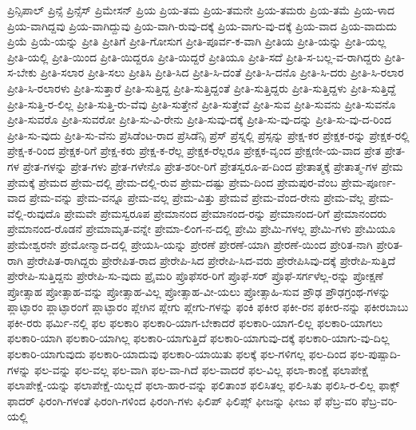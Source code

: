 {ಪ್ರಿನ್ಸಿಪಾಲ್
ಪ್ರಿನ್ಸೆ
ಪ್ರಿನ್ಸೆಸ್
ಪ್ರಿಮೇಸನ್
ಪ್ರಿಯ
ಪ್ರಿಯ-ತಮ
ಪ್ರಿಯ-ತಮನೇ
ಪ್ರಿಯ-ತಮರು
ಪ್ರಿಯ-ತಮೆ
ಪ್ರಿಯ-ಳಾದ
ಪ್ರಿಯ-ವಾಗಿದ್ದವು
ಪ್ರಿಯ-ವಾಗಿದ್ದುವು
ಪ್ರಿಯ-ವಾಗಿ-ರುವು-ದಕ್ಕೆ
ಪ್ರಿಯ-ವಾಗು-ವು-ದಕ್ಕೆ
ಪ್ರಿಯ-ವಾದ
ಪ್ರಿಯ-ವಾದುದು
ಪ್ರಿಯೆ
ಪ್ರಿಯೆ-ಯನ್ನು
ಪ್ರೀತಿ
ಪ್ರೀತಿಗೆ
ಪ್ರೀತಿ-ಗೋಸುಗ
ಪ್ರೀತಿ-ಪೂರ್ವ-ಕ-ವಾಗಿ
ಪ್ರೀತಿಯ
ಪ್ರೀತಿ-ಯನ್ನು
ಪ್ರೀತಿ-ಯಲ್ಲ
ಪ್ರೀತಿ-ಯಲ್ಲಿ
ಪ್ರೀತಿ-ಯಿಂದ
ಪ್ರೀತಿ-ಯಿದ್ದರೂ
ಪ್ರೀತಿ-ಯಿದ್ದರೆ
ಪ್ರೀತಿಯೂ
ಪ್ರೀತಿ-ಸದೆ
ಪ್ರೀತಿ-ಸ-ಬಲ್ಲ-ವ-ರಾಗಿದ್ದರು
ಪ್ರೀತಿ-ಸ-ಬೇಕು
ಪ್ರೀತಿ-ಸಲಾರ
ಪ್ರೀತಿ-ಸಲು
ಪ್ರೀತಿಸಿ
ಪ್ರೀತಿ-ಸಿದ
ಪ್ರೀತಿ-ಸಿ-ದಂತೆ
ಪ್ರೀತಿ-ಸಿ-ದನೊ
ಪ್ರೀತಿ-ಸಿ-ದರು
ಪ್ರೀತಿ-ಸಿ-ರಲಾರ
ಪ್ರೀತಿ-ಸಿ-ರಲಾರಳು
ಪ್ರೀತಿ-ಸುತ್ತಾರೆ
ಪ್ರೀತಿ-ಸುತ್ತಿದ್ದ
ಪ್ರೀತಿ-ಸುತ್ತಿದ್ದಂತೆ
ಪ್ರೀತಿ-ಸುತ್ತಿದ್ದರು
ಪ್ರೀತಿ-ಸುತ್ತಿದ್ದಳು
ಪ್ರೀತಿ-ಸುತ್ತಿದ್ದೆ
ಪ್ರೀತಿ-ಸುತ್ತಿ-ರ-ಲಿಲ್ಲ
ಪ್ರೀತಿ-ಸುತ್ತಿ-ರು-ವೆವು
ಪ್ರೀತಿ-ಸುತ್ತೇನೆ
ಪ್ರೀತಿ-ಸುತ್ತೇವೆ
ಪ್ರೀತಿ-ಸುವ
ಪ್ರೀತಿ-ಸುವನು
ಪ್ರೀತಿ-ಸುವನೊ
ಪ್ರೀತಿ-ಸುವರೊ
ಪ್ರೀತಿ-ಸುವರೋ
ಪ್ರೀತಿ-ಸು-ವಿ-ರೇನು
ಪ್ರೀತಿ-ಸುವು-ದಕ್ಕೆ
ಪ್ರೀತಿ-ಸು-ವು-ದನ್ನು
ಪ್ರೀತಿ-ಸು-ವು-ದ-ರಿಂದ
ಪ್ರೀತಿ-ಸು-ವುದು
ಪ್ರೀತಿ-ಸು-ವೆನು
ಪ್ರೆಸಿಡೆಂಟ-ರಾದ
ಪ್ರೆಸಿಡೆನ್ಸಿ
ಪ್ರೆಸ್
ಪ್ರೆಸ್ನಲ್ಲಿ
ಪ್ರೆಸ್ಸನ್ನು
ಪ್ರೇಕ್ಷ-ಕರ
ಪ್ರೇಕ್ಷಕ-ರನ್ನು
ಪ್ರೇಕ್ಷಕ-ರಲ್ಲಿ
ಪ್ರೇಕ್ಷ-ಕ-ರಿಂದ
ಪ್ರೇಕ್ಷಕ-ರಿಗೆ
ಪ್ರೇಕ್ಷ-ಕರು
ಪ್ರೇಕ್ಷ-ಕ-ರೆಲ್ಲ
ಪ್ರೇಕ್ಷಕ-ರೆಲ್ಲರೂ
ಪ್ರೇಕ್ಷಕ-ವೃಂದ
ಪ್ರೇಕ್ಷಣೀ-ಯ-ವಾದ
ಪ್ರೇತ
ಪ್ರೇತ-ಗಳ
ಪ್ರೇತ-ಗಳನ್ನು
ಪ್ರೇತ-ಗಳು
ಪ್ರೇತ-ಗಳೇನೊ
ಪ್ರೇತ-ಶರೀ-ರಿಗೆ
ಪ್ರೇತಸ್ವರೂ-ಪ-ದಿಂದ
ಪ್ರೇತಾತ್ಮಕ್ಕೆ
ಪ್ರೇತಾತ್ಮ-ಗಳ
ಪ್ರೇಮ
ಪ್ರೇಮಕ್ಕೆ
ಪ್ರೇಮದ
ಪ್ರೇಮ-ದಲ್ಲಿ
ಪ್ರೇಮ-ದಲ್ಲಿ-ರುವ
ಪ್ರೇಮ-ದಷ್ಟು
ಪ್ರೇಮ-ದಿಂದ
ಪ್ರೇಮಪುರ-ವೆಂಬ
ಪ್ರೇಮ-ಪೂರ್ಣ-ವಾದ
ಪ್ರೇಮ-ವನ್ನು
ಪ್ರೇಮ-ವನ್ನೂ
ಪ್ರೇಮ-ವಲ್ಲ
ಪ್ರೇಮ-ವಿತ್ತು
ಪ್ರೇಮವೆ
ಪ್ರೇಮ-ವೆಂದ-ರೇನು
ಪ್ರೇಮ-ವೆಲ್ಲ
ಪ್ರೇಮ-ವೆಲ್ಲಿ-ರುವುದೊ
ಪ್ರೇಮವೇ
ಪ್ರೇಮಸ್ವರೂಪ
ಪ್ರೇಮಾನಂದ
ಪ್ರೇಮಾನಂದ-ರನ್ನು
ಪ್ರೇಮಾನಂದ-ರಿಗೆ
ಪ್ರೇಮಾನಂದರು
ಪ್ರೇಮಾನಂದ-ರೊಡನೆ
ಪ್ರೇಮಾಮೃತ-ವನ್ನೇ
ಪ್ರೇಮಾ-ಲಿಂಗ-ನ-ದಲ್ಲಿ
ಪ್ರೇಮಿ
ಪ್ರೇಮಿ-ಗಳಲ್ಲ
ಪ್ರೇಮಿ-ಗಳು
ಪ್ರೇಮಿಯೂ
ಪ್ರೇಮೇಶ್ವರನೇ
ಪ್ರೇಮೋನ್ಮಾದ-ದಲ್ಲಿ
ಪ್ರೇಯಸಿ-ಯನ್ನು
ಪ್ರೇರಣೆ
ಪ್ರೇರಣೆ-ಯಾಗಿ
ಪ್ರೇರಣೆ-ಯಿಂದ
ಪ್ರೇರಿತ-ನಾಗಿ
ಪ್ರೇರಿತ-ರಾಗಿ
ಪ್ರೇರೇಪಿತ-ರಾಗಿದ್ದರು
ಪ್ರೇರೇಪಿತ-ರಾದ
ಪ್ರೇರೇಪಿ-ಸಿದ
ಪ್ರೇರೇಪಿ-ಸಿದ-ವರು
ಪ್ರೇರೇಪಿಸಿವು-ದಕ್ಕೆ
ಪ್ರೇರೇಪಿ-ಸುತ್ತಿದೆ
ಪ್ರೇರೇಪಿ-ಸುತ್ತಿದ್ದನು
ಪ್ರೇರೇಪಿ-ಸು-ವುದು
ಪ್ರೈಮರಿ
ಪ್ರೊಫೆಸರ-ರಿಗೆ
ಪ್ರೊಫೆ-ಸರ್
ಪ್ರೊಫೆ-ಸರ್ಗಳೆಲ್ಲ-ರನ್ನು
ಪ್ರೋಕ್ಷಣೆ
ಪ್ರೋತ್ಸಾಹ
ಪ್ರೋತ್ಸಾಹ-ವನ್ನು
ಪ್ರೋತ್ಸಾಹ-ವಿಲ್ಲ
ಪ್ರೋತ್ಸಾಹ-ವೀ-ಯಲು
ಪ್ರೋತ್ಸಾಹಿ-ಸುವ
ಪ್ರೌಢ
ಪ್ರೌಢಗ್ರಂಥ-ಗಳನ್ನು
ಪ್ಲಾಟ್ಫಾರಂ
ಪ್ಲಾಟ್ಫಾರಂಗೆ
ಪ್ಲಾಟ್ಫಾರಂ
ಪ್ಲೇಗಿನ
ಪ್ಲೇಗು
ಪ್ಲೇಗು-ಗಳನ್ನು
ಫಂಕಿ
ಫಕೀರ
ಫಕೀ-ರನ
ಫಕೀರ-ನನ್ನು
ಫಕೀರಬಾಬು
ಫಕೀ-ರರು
ಫರ್ಮಿ-ನಲ್ಲಿ
ಫಲ
ಫಲಕಾರಿ
ಫಲಕಾರಿ-ಯಾಗ-ಬೇಕಾದರೆ
ಫಲಕಾರಿ-ಯಾಗ-ಲಿಲ್ಲ
ಫಲಕಾರಿ-ಯಾಗಲು
ಫಲಕಾರಿ-ಯಾಗಿ
ಫಲಕಾರಿ-ಯಾಗಿಲ್ಲ
ಫಲಕಾರಿ-ಯಾಗುತ್ತಿದೆ
ಫಲಕಾರಿ-ಯಾಗುವು-ದಕ್ಕೆ
ಫಲಕಾರಿ-ಯಾಗು-ವು-ದಿಲ್ಲ
ಫಲಕಾರಿ-ಯಾಗುವುದು
ಫಲಕಾರಿ-ಯಾದುವು
ಫಲಕಾರಿ-ಯಾಯಿತು
ಫಲಕ್ಕೆ
ಫಲ-ಗಳಿಗಲ್ಲ
ಫಲ-ದಿಂದ
ಫಲ-ಪುಷ್ಪಾದಿ-ಗಳನ್ನು
ಫಲ-ವನ್ನು
ಫಲ-ವಲ್ಲ
ಫಲ-ವಾಗಿ
ಫಲ-ವಾ-ಗಿದೆ
ಫಲ-ವಾದರೆ
ಫಲ-ವಿಲ್ಲ
ಫಲಾ-ಕಾಂಕ್ಷೆ
ಫಲಾಪೇಕ್ಷೆ
ಫಲಾಪೇಕ್ಷೆ-ಯನ್ನು
ಫಲಾಪೇಕ್ಷೆ-ಯಿಲ್ಲದೆ
ಫಲಾ-ಹಾರ-ವನ್ನು
ಫಲಿತಾಂಶ
ಫಲಿಸಿತಲ್ಲ
ಫಲಿ-ಸಿತು
ಫಲಿಸಿ-ರ-ಲಿಲ್ಲ
ಫಾಕ್ಸ್
ಫಾದರ್
ಫಿರಂಗಿ-ಗಳಂತೆ
ಫಿರಂಗಿ-ಗಳಿಂದ
ಫಿರಂಗಿ-ಗಳು
ಫಿಲಿಪ್
ಫಿಲಿಪ್ಸ್
ಫೀಜನ್ನು
ಫೀಜು
ಫೆ
ಫೆಬ್ರ-ವರಿ
ಫೆಬ್ರ-ವರಿ-ಯಲ್ಲಿ
}
